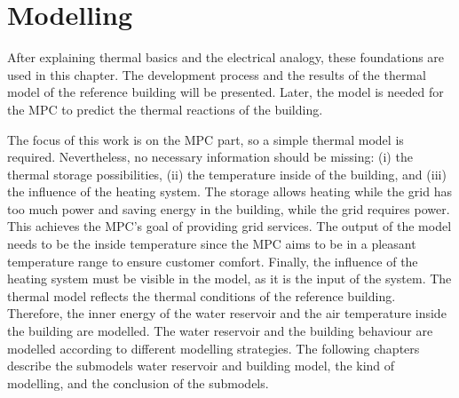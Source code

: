 \chapter{Modelling}
\label{ch:modelling}
After explaining thermal basics and the electrical analogy, these foundations are used in this chapter. The development process and the results of the thermal model of the reference building will be presented. Later, the model is needed for the MPC to predict the thermal reactions of the building.
\newline
    
    The focus of this work is on the MPC part, so a simple thermal model is required. Nevertheless, no necessary information should be missing: (i) the thermal storage possibilities, (ii) the temperature inside of the building, and (iii) the influence of the heating system. The storage allows heating while the grid has too much power and saving energy in the building, while the grid requires power. This achieves the MPC's goal of providing grid services. The output of the model needs to be the inside temperature since the MPC aims to be in a pleasant temperature range to ensure customer comfort. Finally, the influence of the heating system must be visible in the model, as it is the input of the system.
    \newline
    The thermal model reflects the thermal conditions of the reference building. Therefore, the inner energy of the water reservoir and the air temperature inside the building are modelled. The water reservoir and the building behaviour are modelled according to different modelling strategies. The following chapters describe the submodels water reservoir and building model, the kind of modelling, and the conclusion of the submodels.
    
